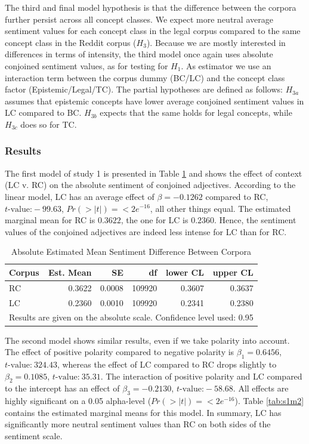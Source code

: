 \documentclass{article}
\begin{document}
The third and final model hypothesis is that the difference between the corpora further persist across all concept classes. We expect more neutral average sentiment values for each concept class in the legal corpus compared to the same concept class in the Reddit corpus ($H_3$). Because we are mostly interested in differences in terms of intensity, the third model once again uses absolute conjoined sentiment values, as for testing for $H_1$. As estimator we use an interaction term between the corpus dummy (BC/LC) and the concept class factor (Epistemic/Legal/TC). The partial hypotheses are defined as follows: $H_{3a}$ assumes that epistemic concepts have lower average conjoined sentiment values in LC compared to BC. $H_{3b}$ expects that the same holds for legal concepts, while $H_{3c}$ does so for TC.



\subsubsection{Results}

The first model of study 1 is presented in Table \ref{tab:s1m1} and shows the effect of context (LC v. RC) on the absolute sentiment of conjoined adjectives. According to the linear model, LC has an average effect of $\beta = -0.1262$ compared to RC, $t\text{-value:} -99.63$, $Pr(>|t|) = <2e^{-16}$, all other things equal. The estimated marginal mean for RC is $0.3622$, the one for LC is $0.2360$. Hence, the sentiment values of the conjoined adjectives are indeed less intense for LC than for RC.

\begin{table}[!h]
\centering
\begin{tabular}{lrrrrr}
  \hline
Corpus & Est. Mean & SE & df & lower CL & upper CL \\ 
  \hline
RC & 0.3622 & 0.0008 & 109920 & 0.3607 & 0.3637 \\ 
  LC & 0.2360 & 0.0010 & 109920 & 0.2341 & 0.2380 \\ 
   \hline
\multicolumn{6}{l}{{\footnotesize Results are given on the absolute scale. Confidence level used: 0.95}}\\
\end{tabular}
\caption{Absolute Estimated Mean Sentiment Difference Between Corpora}
\label{tab:s1m1}
\end{table}

The second model shows similar results, even if we take polarity into account. The effect of positive polarity compared to negative polarity is $\beta_1 = 0.6456$, $t\text{-value:}\ 324.43$, whereas the effect of LC compared to RC drops slightly to $\beta_2 = 0.1085$, $t\text{-value:}\ 35.31$. The interaction of positive polarity and LC compared to the intercept has an effect of $\beta_3 = -0.2130$, $t\text{-value:}-58.68$. All effects are highly significant on a 0.05 alpha-level ($Pr(>|t|) = <2e^{-16}$). Table \ref{tab:s1m2} contains the estimated marginal means for this model. In summary, LC has significantly more neutral sentiment values than RC on both sides of the sentiment scale.
\end{document}
